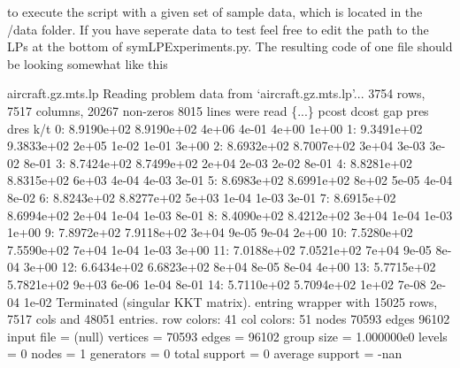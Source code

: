  to execute the script with a given set of sample data, which is located in the /data folder. If you have seperate data to test feel free to edit the path to the L\-Ps at the bottom of sym\-L\-P\-Experiments.\-py. The resulting code of one file should be looking somewhat like this 
\begin{DoxyCode}
 aircraft.gz.mts.lp
Reading problem data from `aircraft.gz.mts.lp\textcolor{stringliteral}{'...}
\textcolor{stringliteral}{3754 rows, 7517 columns, 20267 non-zeros}
\textcolor{stringliteral}{8015 lines were read}
\textcolor{stringliteral}{\{...\}}
\textcolor{stringliteral}{     pcost       dcost       gap    pres   dres   k/t}
\textcolor{stringliteral}{ 0:  8.9190e+02  8.9190e+02  4e+06  4e-01  4e+00  1e+00}
\textcolor{stringliteral}{ 1:  9.3491e+02  9.3833e+02  2e+05  1e-02  1e-01  3e+00}
\textcolor{stringliteral}{ 2:  8.6932e+02  8.7007e+02  3e+04  3e-03  3e-02  8e-01}
\textcolor{stringliteral}{ 3:  8.7424e+02  8.7499e+02  2e+04  2e-03  2e-02  8e-01}
\textcolor{stringliteral}{ 4:  8.8281e+02  8.8315e+02  6e+03  4e-04  4e-03  3e-01}
\textcolor{stringliteral}{ 5:  8.6983e+02  8.6991e+02  8e+02  5e-05  4e-04  8e-02}
\textcolor{stringliteral}{ 6:  8.8243e+02  8.8277e+02  5e+03  1e-04  1e-03  3e-01}
\textcolor{stringliteral}{ 7:  8.6915e+02  8.6994e+02  2e+04  1e-04  1e-03  8e-01}
\textcolor{stringliteral}{ 8:  8.4090e+02  8.4212e+02  3e+04  1e-04  1e-03  1e+00}
\textcolor{stringliteral}{ 9:  7.8972e+02  7.9118e+02  3e+04  9e-05  9e-04  2e+00}
\textcolor{stringliteral}{10:  7.5280e+02  7.5590e+02  7e+04  1e-04  1e-03  3e+00}
\textcolor{stringliteral}{11:  7.0188e+02  7.0521e+02  7e+04  9e-05  8e-04  3e+00}
\textcolor{stringliteral}{12:  6.6434e+02  6.6823e+02  8e+04  8e-05  8e-04  4e+00}
\textcolor{stringliteral}{13:  5.7715e+02  5.7821e+02  9e+03  6e-06  1e-04  8e-01}
\textcolor{stringliteral}{14:  5.7110e+02  5.7094e+02  1e+02  7e-08  2e-04  1e-02}
\textcolor{stringliteral}{Terminated (singular KKT matrix).}
\textcolor{stringliteral}{entring wrapper with 15025 rows, 7517 cols and 48051 entries.}
\textcolor{stringliteral}{row colors: 41}
\textcolor{stringliteral}{col colors: 51}
\textcolor{stringliteral}{nodes 70593}
\textcolor{stringliteral}{edges 96102}
\textcolor{stringliteral}{input file = (null)}
\textcolor{stringliteral}{vertices = 70593}
\textcolor{stringliteral}{edges = 96102}
\textcolor{stringliteral}{group size = 1.000000e0}
\textcolor{stringliteral}{levels = 0}
\textcolor{stringliteral}{nodes = 1}
\textcolor{stringliteral}{generators = 0}
\textcolor{stringliteral}{total support = 0}
\textcolor{stringliteral}{average support = -nan}

\end{DoxyCode}
